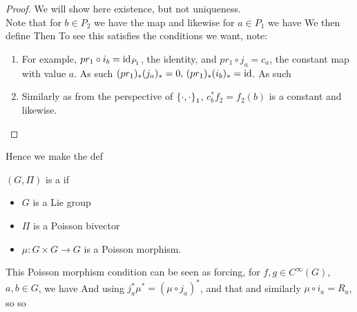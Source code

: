 \documentclass{article}
\begin{document}
\begin{proof}
We will show here existence, but not uniqueness. \\
Note that for $b \in P_2$ we have the map 
and likewise for $a \in P_1$ we have 
We then define 
Then 
To see this satisfies the conditions we want, note:
\begin{enumerate}
    \item For example, $pr_1 \circ i_b = \id_{P_1}$, the identity, and  $pr_1\circ j_a = c_a$, the constant map with value $a$. As such $(pr_1)_\ast (j_a)_\ast =0, \, (pr_1)_\ast (i_b)_\ast = \id$. As such 
    \item Similarly 
    as from the perspective of $\acomm[\cdot]{\cdot}_1$, $c_b^\ast f_2 = f_2(b)$ is a constant and likewise.
\end{enumerate}
\end{proof}
Hence we make the def
\begin{definition}
$(G,\Pi)$ is a  if 
\begin{itemize}
    \item $G$ is a Lie group
    \item $\Pi$ is a Poisson bivector
    \item $\mu : G \times G \to G$ is a Poisson morphism. 
\end{itemize}
\end{definition}

This Poisson morphism condition can be seen as forcing, for $f,g \in C^\infty(G)$, $a,b \in G$, we have 
And using $j_a^\ast \mu^\ast = (\mu \circ j_a)^\ast$, and that 
and similarly $\mu \circ i_a = R_a$, so 
so 
\end{document}
